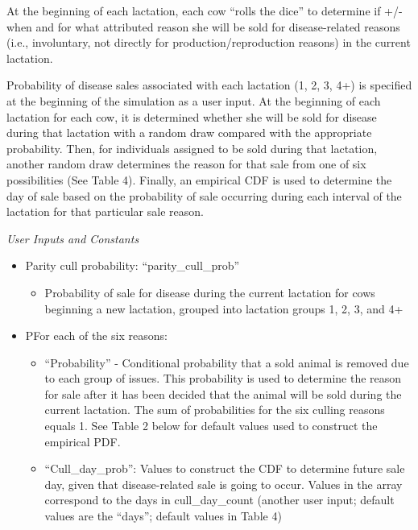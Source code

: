 \documentclass{article}
\begin{document}
\begin{refsection}
\begin{enumerate}
        At the beginning of each lactation, each cow “rolls the dice” to determine if +/- when and for what attributed reason she will be sold for disease-related reasons (i.e., involuntary, not directly for production/reproduction reasons) in the current lactation.   
        
        Probability of disease sales associated with each lactation (1, 2, 3, 4+) is specified at the beginning of the simulation as a user input. At the beginning of each lactation for each cow, it is determined whether she will be sold for disease during that lactation with a random draw compared with the appropriate probability. Then, for individuals assigned to be sold during that lactation, another random draw determines the reason for that sale from one of six possibilities (See Table 4). Finally, an empirical CDF is used to determine the day of sale based on the probability of sale occurring during each interval of the lactation for that particular sale reason. 


         \textit{User Inputs and Constants}
         \vspace{0.1cm}

         \begin{itemize}
             \item Parity cull probability: “parity\_cull\_prob” 
            \begin{itemize}
                \item Probability of sale for disease during the current lactation for cows beginning a new lactation, grouped into lactation groups 1, 2, 3, and 4+
            \end{itemize}
             \item PFor each of the six reasons:
            \begin{itemize}
                \item “Probability” - Conditional probability that a sold animal is removed due to each group of issues. This probability is used to determine the reason for sale after it has been decided that the animal will be sold during the current lactation. The sum of probabilities for the six culling reasons equals 1. See Table 2 below for default values used to construct the empirical PDF.
                \item “Cull\_day\_prob”: Values to construct the CDF to determine future sale day, given that disease-related sale is going to occur. Values in the array correspond to the days in cull\_day\_count (another user input; default values are the “days”; default values in Table 4) 
            \end{itemize}


\end{itemize}
\end{enumerate}
\end{refsection}
\end{document}
